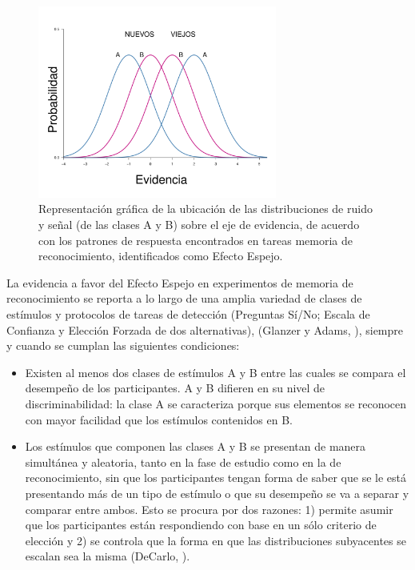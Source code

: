 \begin{figure}[h]
\centering
\includegraphics[width=0.7\textwidth]{Figures/EfectoEspejo}
\decoRule
\caption[Efecto Espejo: Las distribuciones de ruido y señal A y B se reflejan entre sí]{Representación gráfica de la ubicación de las distribuciones de ruido y señal (de las clases A y B) sobre el eje de evidencia, de acuerdo con los patrones de respuesta encontrados en tareas memoria de reconocimiento, identificados como Efecto Espejo.}
\label{fig:Ejem_EfectoEspejo}
\end{figure}

La evidencia a favor del Efecto Espejo en experimentos de memoria de reconocimiento se reporta a lo largo de una amplia variedad de clases de estímulos y protocolos de tareas de detección (Preguntas Sí/No; Escala de Confianza y Elección Forzada de dos alternativas), (Glanzer y Adams, \citeyear{Glanzer1990}), siempre y cuando se cumplan las siguientes condiciones:\\

\begin{itemize}
\item Existen al menos dos clases de estímulos A y B entre las cuales se compara el desempeño de los participantes. A y B difieren en su nivel de discriminabilidad: la clase A se caracteriza porque sus elementos se reconocen con mayor facilidad que los estímulos contenidos en B.\\

\item Los estímulos que componen las clases A y B se presentan de manera simultánea y aleatoria, tanto en la fase de estudio como en la de reconocimiento, sin que los participantes tengan forma de saber que se le está presentando más de un tipo de estímulo o que su desempeño se va a separar y comparar entre ambos. Esto se procura por dos razones: 1) permite asumir que los participantes están respondiendo con base en un sólo criterio de elección y 2) se controla que la forma en que las distribuciones subyacentes se escalan sea la misma (DeCarlo, \citeyear{DeCarlo2007}).\\
\end{itemize}

